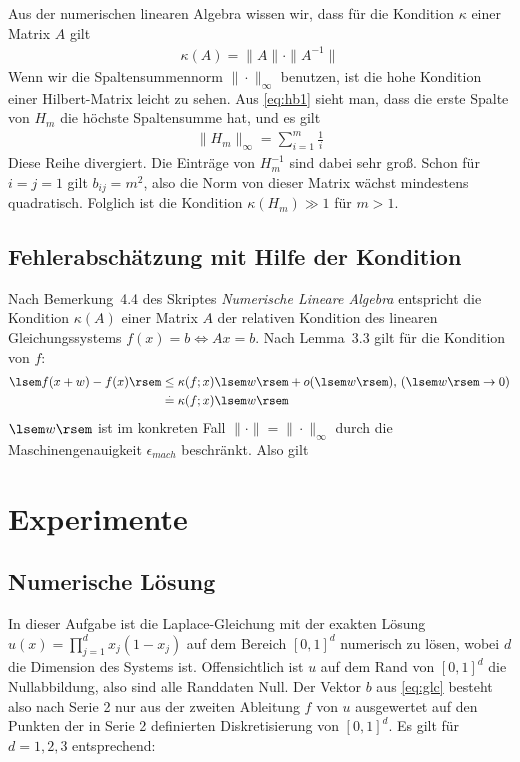 \documentclass[smallheadings]{scrartcl}
\numberwithin{equation}{section}
\begin{document}
Aus der numerischen linearen Algebra wissen wir, dass für die Kondition $\kappa$ einer Matrix $A$ gilt
\begin{align}
	\kappa(A)=\|A\|\cdot \|A^{-1}\|
	\label{eq:kond}
\end{align}
Wenn wir die Spaltensummennorm $\|\cdot \|_{\infty}$ benutzen, ist die hohe Kondition einer Hilbert-Matrix leicht zu sehen. Aus \ref{eq:hb1}  sieht man, dass die erste Spalte von $H_m$ die höchste Spaltensumme hat, und es gilt
\begin{align}
	\|H_m\|_{\infty}=\sum_{i=1}^{m}\frac{1}{i}
\end{align}
Diese Reihe divergiert. Die Einträge von $H_m^{-1}$ sind dabei sehr groß. Schon für $i=j=1$ gilt $b_{ij} = m^2$, also die Norm von dieser Matrix wächst mindestens quadratisch. Folglich ist die Kondition $\kappa(H_m)\gg1$ für $m>1$.

\subsection{Fehlerabschätzung mit Hilfe der Kondition}

Nach Bemerkung~4.4 des Skriptes \textit{Numerische Lineare Algebra} entspricht die Kondition $\kappa(A)$ einer Matrix $A$ der relativen Kondition des linearen Gleichungssystems $f(x)=b \iff Ax=b$. Nach Lemma~3.3 gilt für die Kondition von $f$:
\begin{align}
\lsem f(x+w)-f(x)\rsem &\leq \kappa(f;x)\lsem w\rsem + o(\lsem w \rsem)\text{,   } (\lsem w \rsem \rightarrow 0)\\
&\stackrel{.}{=} \kappa(f;x)\lsem w\rsem
\end{align}
$\lsem w \rsem$ ist im konkreten Fall $\|\cdot\|=\|\cdot\|_\infty$ durch die Maschinengenauigkeit $\epsilon_{mach}$ beschränkt. Also gilt %

\section{Experimente}

\subsection{Numerische Lösung}

In dieser Aufgabe ist die Laplace-Gleichung mit der exakten Lösung $u(x)=\prod_{j=1}^{d}x_j(1-x_j)$ auf dem Bereich $[0, 1]^d$ numerisch zu lösen, wobei $d$ die Dimension des Systems ist. Offensichtlich ist $u$ auf dem Rand von $[0, 1]^d$ die Nullabbildung, also sind alle Randdaten Null. Der Vektor $b$ aus \ref{eq:glc} besteht also nach Serie 2 nur aus der zweiten Ableitung $f$ von $u$ ausgewertet auf den Punkten der in Serie 2 definierten Diskretisierung von $[0, 1]^d$. Es gilt für $d=1, 2, 3$ entsprechend:
\end{document}
